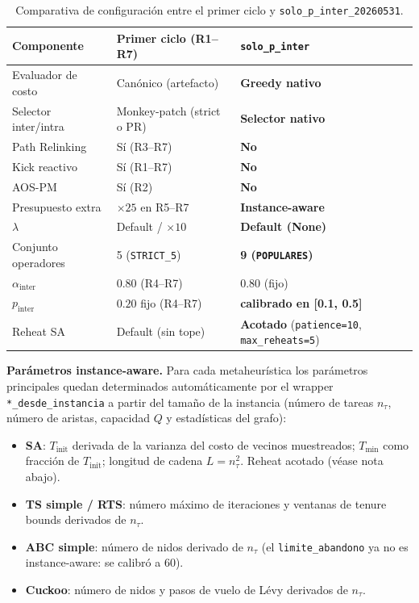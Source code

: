 \begin{table}[h]
\centering
\caption{Comparativa de configuración entre el primer ciclo y
         \texttt{solo\_p\_inter\_20260531}.}
\label{tab:config-solo-p-inter}
\small
\begin{tabular}{lll}
\toprule
Componente & Primer ciclo (R1--R7) & \texttt{solo\_p\_inter} \\
\midrule
Evaluador de costo    & Canónico (artefacto)       & \textbf{Greedy nativo} \\
Selector inter/intra  & Monkey-patch (strict o PR) & \textbf{Selector nativo} \\
Path Relinking        & Sí (R3--R7)                & \textbf{No} \\
Kick reactivo         & Sí (R1--R7)                & \textbf{No} \\
AOS-PM                & Sí (R2)                    & \textbf{No} \\
Presupuesto extra     & $\times 25$ en R5--R7      & \textbf{Instance-aware} \\
$\lambda$             & Default / $\times 10$      & \textbf{Default (None)} \\
Conjunto operadores   & 5 (\texttt{STRICT\_5})     & \textbf{9 (\texttt{POPULARES})} \\
$\alpha_{\text{inter}}$ & $0.80$ (R4--R7)          & $0.80$ (fijo) \\
$p_{\text{inter}}$    & $0.20$ fijo (R4--R7)       & \textbf{calibrado en {[}0.1, 0.5{]}} \\
Reheat SA             & Default (sin tope)         & \textbf{Acotado} (\texttt{patience=10}, \texttt{max\_reheats=5}) \\
\bottomrule
\end{tabular}
\end{table}

\medskip
\noindent\textbf{Parámetros instance-aware.} Para cada metaheurística
los parámetros principales quedan determinados automáticamente por el
wrapper \texttt{*\_desde\_instancia} a partir del tamaño de la
instancia (número de tareas $n_\tau$, número de aristas, capacidad $Q$
y estadísticas del grafo):

\begin{itemize}
\item \textbf{SA}: $T_{\text{init}}$ derivada de la varianza del costo
  de vecinos muestreados; $T_{\min}$ como fracción de $T_{\text{init}}$;
  longitud de cadena $L = n_\tau^2$. Reheat acotado (véase nota
  abajo).
\item \textbf{TS simple / RTS}: número máximo de iteraciones y
  ventanas de tenure bounds derivados de $n_\tau$.
\item \textbf{ABC simple}: número de nidos derivado de $n_\tau$ (el
  \texttt{limite\_abandono} ya no es instance-aware: se calibró a $60$).
\item \textbf{Cuckoo}: número de nidos y pasos de vuelo de Lévy
  derivados de $n_\tau$.
\end{itemize}

